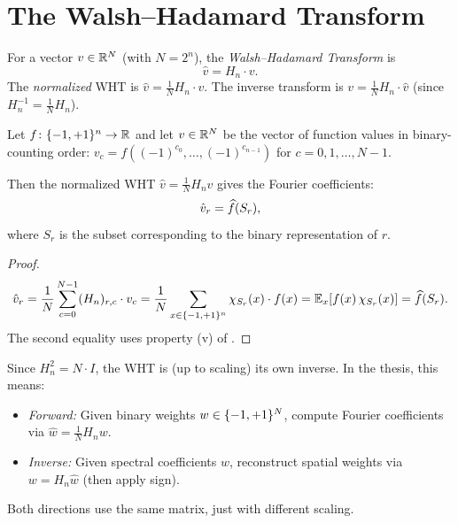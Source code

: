 \section{The Walsh--Hadamard Transform}\label{sec:wht-def}

\begin{definition}\label{def:wht}
For a vector $v \in \mathbb{R}^N$ (with $N = 2^n$), the \emph{Walsh--Hadamard
Transform} is
\begin{equation}\label{eq:wht}
  \hat{v} = H_n \cdot v.
\end{equation}
The \emph{normalized} WHT is $\hat{v} = \frac{1}{N} H_n \cdot v$.
The inverse transform is $v = \frac{1}{N} H_n \cdot \hat{v}$
(since $H_n^{-1} = \frac{1}{N} H_n$).
\end{definition}

\begin{theorem}\label{thm:wht-fourier}
Let $f \colon \{-1,+1\}^n \to \mathbb{R}$ and let $v \in \mathbb{R}^N$ be the vector of
function values in binary-counting order:
$v_c = f((-1)^{c_0}, \ldots, (-1)^{c_{n-1}})$ for
$c = 0, 1, \ldots, N-1$.

Then the normalized WHT $\hat{v} = \frac{1}{N} H_n v$ gives the Fourier
coefficients:
\[
  \hat{v}_r = \widehat{f}(S_r),
\]
where $S_r$ is the subset corresponding to the binary representation of $r$.
\end{theorem}

\begin{proof}
\[
  \hat{v}_r = \frac{1}{N} \sum_{c=0}^{N-1} (H_n)_{r,c} \cdot v_c
  = \frac{1}{N} \sum_{x \in \{-1,+1\}^n} \chi_{S_r}(x) \cdot f(x)
  = \mathbb{E}_x[f(x)\, \chi_{S_r}(x)] = \widehat{f}(S_r).
\]
The second equality uses property (v) of .
\end{proof}

\begin{remark}\label{rem:self-inverse}
Since $H_n^2 = N \cdot I$, the WHT is (up to scaling) its own inverse.
In the thesis, this means:
\begin{itemize}
  \item \emph{Forward:} Given binary weights $w \in \{-1,+1\}^N$, compute
    Fourier coefficients via $\hat{w} = \frac{1}{N} H_n w$.
  \item \emph{Inverse:} Given spectral coefficients $\hat{w}$, reconstruct
    spatial weights via $w = H_n \hat{w}$ (then apply sign).
\end{itemize}
Both directions use the same matrix, just with different scaling.
\end{remark}


